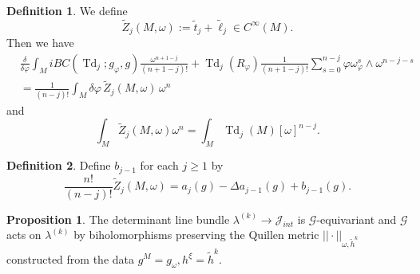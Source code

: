 \documentclass[10pt,a4paper]{amsart}
\DeclareMathOperator{\Td}{Td}
\theoremstyle{definition}
\newtheorem{definition}{Definition}
\newtheorem{proposition}{Proposition}
\theoremstyle{remark}
\begin{document}
\setcounter{section}{3}
\setcounter{equation}{4}
\setcounter{conj}{0}
\setcounter{definition}{1}
\setcounter{lemma}{0}
\setcounter{maindefn}{0}
\setcounter{mainlem}{0}
\setcounter{mainprop}{0}
\setcounter{mainthm}{2}
\setcounter{proposition}{0}
\setcounter{remark}{1}
\setcounter{theo}{0}
\setcounter{theorem}{2}
\begin{definition}
We define
\begin{equation*}
\widetilde{Z}_j(M,\omega) := \widetilde{t}_j+\widetilde{\ell}_j\in C^\infty(M).
\end{equation*}
Then we have
\begin{align}\label{quilvar}
&\frac{\delta}{\delta\varphi} \int_M iBC(\Td_j;g_{\varphi},g)\frac{\omega^{n+1-j}}{(n+1-j)!}+\Td_{j}(R_\varphi)\frac{1}{(n+1-j)!}\sum^{n-j}_{s=0}\varphi \omega_{\varphi}^s\wedge \omega^{n-j-s}\nonumber\\
&=\frac{1}{(n-j)!}\int_M \delta\varphi \,\widetilde{Z}_j(M,\omega)\, \omega^n
\end{align}
and
\begin{equation*}
\int_M \widetilde{Z}_j(M,\omega) \omega^n = \int_M \Td_j(M) [\omega]^{n-j}.
\end{equation*}
\end{definition}

\setcounter{section}{3}
\setcounter{equation}{7}
\setcounter{conj}{0}
\setcounter{definition}{2}
\setcounter{lemma}{0}
\setcounter{maindefn}{0}
\setcounter{mainlem}{0}
\setcounter{mainprop}{0}
\setcounter{mainthm}{2}
\setcounter{proposition}{0}
\setcounter{remark}{1}
\setcounter{theo}{0}
\setcounter{theorem}{2}
\begin{definition}
Define $b_{j-1}$ for each $j\geq 1$ by
\begin{equation*}
\frac{n!}{(n-j)!}\widetilde{Z}_j(M,\omega)=a_j(g)-\Delta a_{j-1}(g)+b_{j-1}(g).
\end{equation*}
\end{definition}

\setcounter{section}{3}
\setcounter{equation}{8}
\setcounter{conj}{0}
\setcounter{definition}{3}
\setcounter{lemma}{0}
\setcounter{maindefn}{0}
\setcounter{mainlem}{0}
\setcounter{mainprop}{0}
\setcounter{mainthm}{2}
\setcounter{proposition}{0}
\setcounter{remark}{1}
\setcounter{theo}{0}
\setcounter{theorem}{2}
\begin{proposition}
The determinant line bundle $\lambda^{(k)}\rightarrow \mathcal{J}_{int}$ is $\mathcal{G}$-equivariant and $\mathcal{G}$ acts on $\lambda^{(k)}$ by biholomorphisms preserving the Quillen metric $||\cdot||_{\omega,\widetilde{h}^k}$ constructed from the data $g^M=g_\omega, h^\xi=\widetilde{h}^k$.
\end{proposition}
\end{document}
